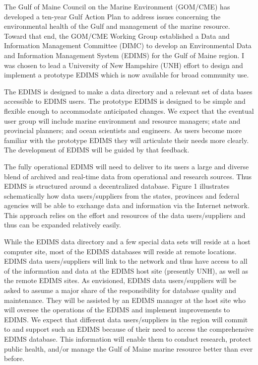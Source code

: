 \medskip
\large
{}
\normalsize
\bigskip


	The Gulf of Maine Council on the Marine Environment (GOM/CME) has 
developed a ten-year Gulf Action Plan to address issues concerning the 
environmental health of the Gulf and management of the marine resource.  
Toward that end, the GOM/CME Working Group established a Data and 
Information Management Committee (DIMC) to develop an Environmental 
Data and Information Management System (EDIMS) for the Gulf of Maine 
region.  I was chosen to lead a University of New Hampshire (UNH) effort 
to design and implement a prototype EDIMS which is now available for 
broad community use.

\bigskip
{}

	The EDIMS is designed to make a data directory and a relevant set of 
data bases accessible to EDIMS users.  The prototype EDIMS is designed to 
be simple and flexible enough to accommodate anticipated changes.  We 
expect that the eventual user group will include marine environment and 
resource managers; state and provincial planners; and ocean scientists and 
engineers.  As users become more familiar with the prototype EDIMS they 
will articulate their needs more clearly.  The development of EDIMS will 
be guided by that feedback.

	The fully operational EDIMS will need to deliver to its users a large 
and diverse blend of archived and real-time data from operational and 
research sources.  Thus EDIMS is structured around a decentralized 
database.  Figure 1 illustrates schematically how data users/suppliers 
from the states, provinces and federal agencies will be able to exchange 
data and information via the Internet network.  This approach relies on the 
effort and resources of the data users/suppliers and thus can be expanded 
relatively easily.

	While the EDIMS data directory and a few special data sets will 
reside at a host computer site, most of the EDIMS databases will reside at 
remote locations.  EDIMS data users/suppliers will link to the network and 
thus have access to all of the information and data at the EDIMS host site 
(presently UNH), as well as the remote EDIMS sites.  As envisioned, EDIMS 
data users/suppliers will be asked to assume a major share of the 
responsibility for database quality and maintenance.  They will be 
assisted by an EDIMS manager at the host site who will oversee the 
operations of the EDIMS and implement improvements to EDIMS.  We expect 
that different data users/suppliers in the region will commit to and 
support such an EDIMS because of their need to access the comprehensive 
EDIMS database.  This information will enable them to conduct research, 
protect public health, and/or manage the Gulf of Maine marine resource 
better than ever before.

